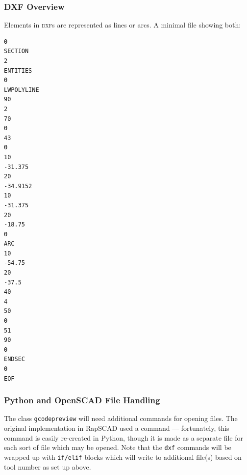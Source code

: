 \documentclass{ltxdoc}
\begin{document}
\subsubsection{DXF Overview}

Elements in \textsc{dxf}s are represented as lines or arcs. A minimal file showing both:

\begin{verbatim}
0
SECTION
2
ENTITIES
0
LWPOLYLINE
90
2
70
0
43
0
10
-31.375
20
-34.9152
10
-31.375
20
-18.75
0
ARC
10
-54.75
20
-37.5
40
4
50
0
51
90
0
ENDSEC
0
EOF
\end{verbatim}

\subsubsection{Python and OpenSCAD File Handling}

The class \verb|gcodepreview| will need additional commands for opening files. The original implementation in {RapSCAD} used a command  --- fortunately, this command is easily re-created in Python, though it is made as a separate file for each sort of file which may be opened. Note that the \verb|dxf| commands will be wrapped up with \verb|if/elif| blocks which will write to additional file(s) based on tool number as set up above.
\end{document}
